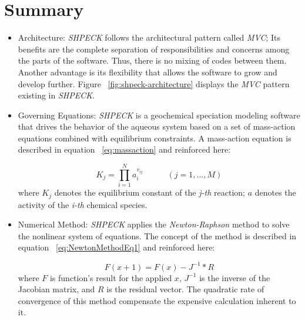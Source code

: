 \section{Summary}
\begin{itemize}
\item Architecture: \emph{SHPECK} follows the architectural pattern called \emph{MVC}; Its benefits are the complete separation of responsibilities and concerns among the parts of the software. Thus, there is no mixing of codes between them. Another advantage is its flexibility that allows the software to grow and develop further. Figure ~\ref{fig:shpeck-architecture} displays the \emph{MVC} pattern existing in \emph{SHPECK}.
\item Governing Equations: \emph{SHPECK} is a geochemical speciation modeling software that drives the behavior of the aqueous system based on a set of mass-action equations combined with equilibrium constraints. A mass-action equation is described in equation  ~\ref{eq:massaction} and reinforced here:

\begin{equation}
K_j =  \prod\limits_{i=1}^N  a_i^{v_{ij}} \hspace{35pt}    (j = 1, ... , M)
\end{equation}
where $K_j$ denotes the equilibrium constant of the \emph{j-th} reaction; $a$ denotes the activity of the \emph{i-th} chemical species.

\item Numerical Method: \emph{SHPECK} applies the \emph{Newton-Raphson} method to solve the nonlinear system of equations. The concept of the method is described in equation ~\ref{eq:NewtonMethodEq1} and reinforced here:

\begin{equation}
F(x+1) = F(x) - J^{-1} * R
\end{equation}
where $F$ is function's result for the applied $x$, $J^{-1}$ is the inverse of the Jacobian matrix, and $R$ is the residual vector. The quadratic rate of convergence of this method compensate the expensive calculation inherent to it.


\end{itemize}
